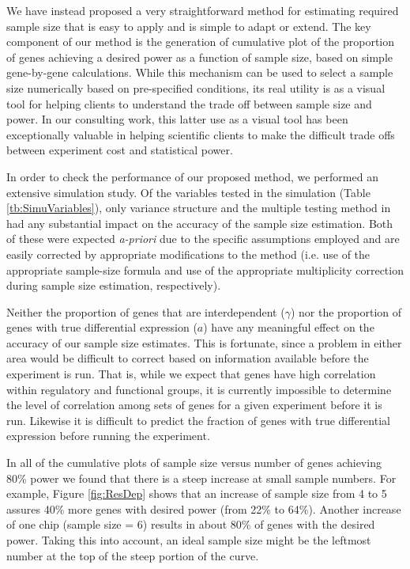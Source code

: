 \documentclass[12pt]{article}
\begin{document}
We have instead proposed a very straightforward method for
estimating required sample size that is easy to apply and is simple
to adapt or extend. The key component of our method is the
generation of cumulative plot of the proportion of genes achieving a
desired power as a function of sample size, based on simple
gene-by-gene calculations.  While this mechanism can be used to
select a sample size numerically based on pre-specified conditions,
its real utility is as a visual tool for helping clients to
understand the trade off between sample size and power.  In our
consulting work, this latter use as a visual tool has been
exceptionally valuable in helping scientific clients to make the
difficult trade offs between experiment cost and statistical power.

In order to check the performance of our proposed method, we
performed an extensive simulation study. Of the variables tested in
the simulation (Table \ref{tb:SimuVariables}), only variance
structure and the multiple testing method in had any substantial
impact on the accuracy of the sample size estimation.  Both of these
were expected \textit{a-priori} due to the specific assumptions
employed and are easily corrected by appropriate modifications to
the method (i.e. use of the appropriate sample-size formula and use
of the appropriate multiplicity correction during sample size
estimation, respectively).

Neither the proportion of genes that are interdependent ($\gamma$)
nor the proportion of genes with true differential expression ($a$)
have any meaningful effect on the accuracy of our sample size
estimates.  This is fortunate, since a problem in either area would
be difficult to correct based on information available before the
experiment is run.  That is, while we expect that genes have high
correlation within regulatory and functional groups, it is currently
impossible to determine the level of correlation among sets of genes
for a given experiment before it is run.  Likewise it is difficult
to predict the fraction of genes with true differential expression
before running the experiment.

In all of the cumulative plots of sample size versus number of genes
achieving 80\% power we found that there is a steep increase at
small sample numbers. For example, Figure \ref{fig:ResDep} shows
that an increase of sample size from 4 to 5 assures 40\% more genes
with desired power (from 22\% to 64\%).  Another increase of one
chip (sample size = 6) results in about 80\% of genes with the desired
power. Taking this into account, an ideal sample size might be the
leftmost number at the top of the steep portion of the curve.
\end{document}
